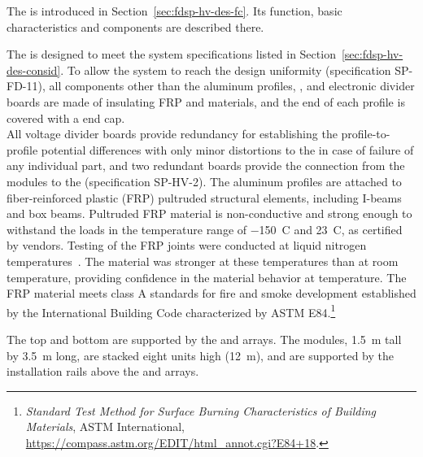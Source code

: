 The  is introduced in Section~\ref{sec:fdsp-hv-des-fc}. Its function, basic characteristics and components are described there. 

The  %
is designed to %
meet the system specifications listed in Section~\ref{sec:fdsp-hv-des-consid}. %
To allow the system to reach the design \efield{} uniformity 
(specification SP-FD-11), 
all components other than the aluminum profiles, , and electronic divider boards are made of insulating FRP and \frfour materials, and the end of each profile is covered with a  end cap. \\


All voltage divider boards provide redundancy for establishing the profile-to-profile potential differences with only minor distortions to the \efield in case of failure of any individual part, and two redundant boards provide the connection from the  modules to the  
(specification SP-HV-2).
The aluminum profiles are attached to fiber-reinforced plastic (FRP) pultruded structural elements, including I-beams and box beams.  
Pultruded FRP material is non-conductive and strong enough to withstand the  loads  in the temperature range of \SI{-150}{C} and \SI{23}{C}, as certified by vendors. Testing of the FRP joints were conducted at liquid nitrogen temperatures~\cite{bib:docdb1504}. 
The material was stronger at these temperatures than at room temperature, 
providing confidence in the material behavior at \lar  temperature. The FRP material meets class A standards for fire and smoke development established by the International Building Code characterized by ASTM E84.\footnote{\textit{Standard Test Method for Surface Burning Characteristics of Building Materials}, ASTM International, \url{https://compass.astm.org/EDIT/html_annot.cgi?E84+18}.}

The top and bottom  %
are supported by the  and  arrays. The  modules, 
\SI{1.5}{\m} tall by \SI{3.5}{\m} long, are stacked eight units high (\SI{12}{\m}), and are supported by the installation rails above the  and  arrays.


